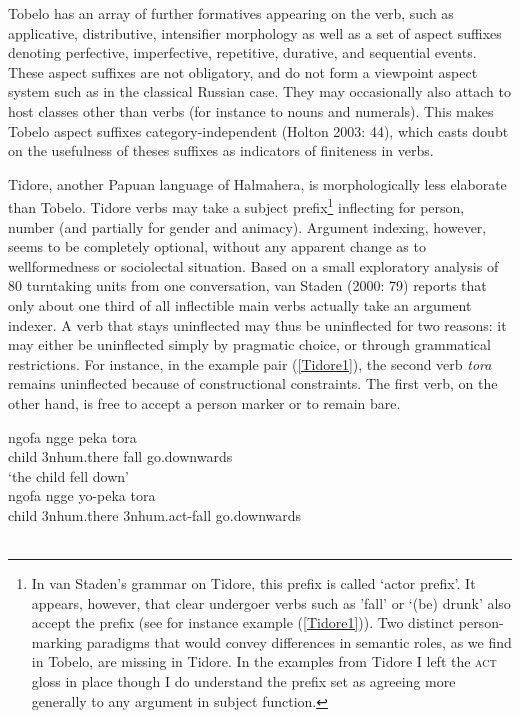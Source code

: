 Tobelo has an array of further formatives appearing on the verb, such as applicative, distributive, intensifier morphology as well as a set of aspect suffixes denoting perfective, imperfective, repetitive, durative, and sequential events. These aspect suffixes are not obligatory, and do not form a viewpoint aspect system such as in the classical Russian case. They may occasionally also attach to host classes other than verbs (for instance to nouns and numerals). This makes Tobelo aspect suffixes category-independent (Holton 2003: 44), which casts doubt on the usefulness of theses suffixes as indicators of finiteness in verbs. 

Tidore, another Papuan language of Halmahera, is morphologically less elaborate than Tobelo. Tidore verbs may take a subject prefix\footnote{In van Staden's grammar on Tidore, this prefix is called `actor prefix'. It appears, however, that clear undergoer verbs such as 'fall' or `(be) drunk' also accept the prefix (see for instance example (\ref{Tidore1})). Two distinct person-marking paradigms that would convey differences in semantic roles, as we find in Tobelo, are missing in Tidore. In the examples from Tidore I left the \textsc{act} gloss in place though I do understand the prefix set as agreeing more generally to any argument in subject function.} inflecting for person, number (and partially for gender and animacy). Argument indexing, however, seems to be completely optional, without any apparent change as to wellformedness or sociolectal situation. Based on a small exploratory analysis of 80 turntaking units from one conversation, van Staden (2000: 79) reports that only about one third of all inflectible main verbs actually take an argument indexer. A verb that stays uninflected may thus be uninflected for two reasons: it may either be uninflected simply by pragmatic choice, or through grammatical restrictions. For instance, in the example pair (\ref{Tidore1}), the second verb \textit{tora} remains uninflected because of constructional constraints. The first verb, on the other hand, is free to accept a person marker or to remain bare.

\pex \label{Tidore1}
\a
\gll ngofa ngge peka tora \\
child 3\acs{nhum}.there fall go.downwards \\
\glft `the child fell down’ \\ 
\endgl
\a
\gla ngofa ngge yo-peka tora \\ 
child 3\acs{nhum}.there 3\acs{nhum}.\acs{act}-fall go.downwards \\
\glft  {}\\ 
\endgl
\xe


